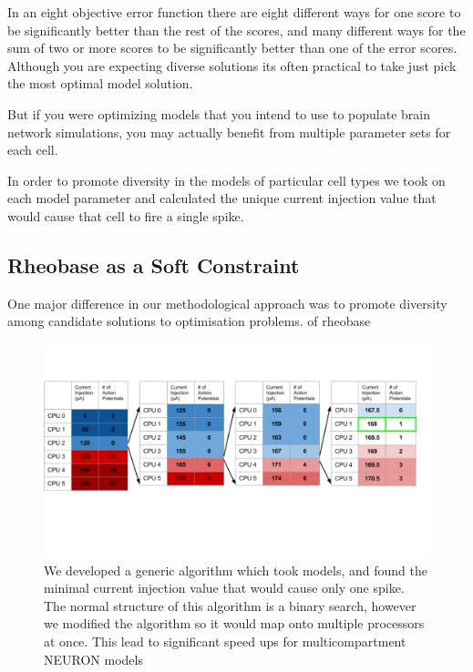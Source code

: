 





 

In an eight objective error function there are eight different ways for one score to be significantly better than the rest of the scores, and many different ways for the sum of two or more scores to be significantly better than one of the error scores. Although you are expecting diverse solutions its often practical to take just pick the most optimal model solution.

But if you were optimizing models that you intend to use to populate brain network simulations, you may actually benefit from multiple parameter sets for each cell.

In order to promote diversity in the models of particular cell types we took on each model parameter and calculated the unique current injection value that would cause that cell to fire a single spike. 

\subsection{Rheobase as a Soft Constraint}
One major difference in our methodological approach was to promote diversity among candidate solutions to optimisation problems. 
of rheobase 
\begin{figure}    
\begin{center}
\includegraphics[width=0.6\linewidth]{figures/rheobase_algorithm}
\caption{We developed a generic algorithm which took models, and found the minimal current injection value that would cause only one spike. The normal structure of this algorithm is a binary search, however we modified the algorithm so it would map onto multiple processors at once. This lead to significant speed ups for multicompartment NEURON models}

\end{center}
\end{figure}  

